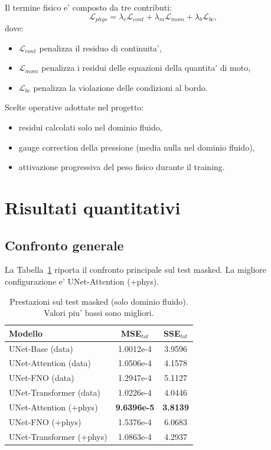 \documentclass[final,3p,times]{elsarticle}
\begin{document}
Il termine fisico e' composto da tre contributi:
\begin{equation}
\mathcal{L}_{phys}=\lambda_c\mathcal{L}_{cont}+\lambda_m\mathcal{L}_{mom}+\lambda_b\mathcal{L}_{bc},
\end{equation}
dove:
\begin{itemize}
    \item $\mathcal{L}_{cont}$ penalizza il residuo di continuita',
    \item $\mathcal{L}_{mom}$ penalizza i residui delle equazioni della quantita' di moto,
    \item $\mathcal{L}_{bc}$ penalizza la violazione delle condizioni al bordo.
\end{itemize}

Scelte operative adottate nel progetto:
\begin{itemize}
    \item residui calcolati solo nel dominio fluido,
    \item gauge correction della pressione (media nulla nel dominio fluido),
    \item attivazione progressiva del peso fisico durante il training.
\end{itemize}

\section{Risultati quantitativi}
\subsection{Confronto generale}
La Tabella~\ref{tab:main} riporta il confronto principale sul test masked. La migliore configurazione e' UNet-Attention (+phys).

\begin{table}[htbp]
\centering
\caption{Prestazioni sul test masked (solo dominio fluido). Valori piu' bassi sono migliori.}
\label{tab:main}
\begin{tabular}{lcc}
\toprule
Modello & MSE$_{tot}$ & SSE$_{tot}$ \\
\midrule
UNet-Base (data) & 1.0012e-4 & 3.9596 \\
UNet-Attention (data) & 1.0506e-4 & 4.1578 \\
UNet-FNO (data) & 1.2947e-4 & 5.1127 \\
UNet-Transformer (data) & 1.0226e-4 & 4.0446 \\
UNet-Attention (+phys) & \textbf{9.6396e-5} & \textbf{3.8139} \\
UNet-FNO (+phys) & 1.5376e-4 & 6.0683 \\
UNet-Transformer (+phys) & 1.0863e-4 & 4.2937 \\
\bottomrule
\end{tabular}
\end{table}
\end{document}
